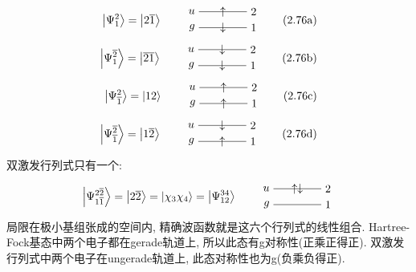 \begin{align*}
\ket{\Psi_1^2}=\ket{2\bar{1}}\qquad
\begin{tikzpicture}[baseline={([yshift=-.8ex]current bounding box.center)}]
\draw (0,0)node[left] {$u$}--node[pos=0.5]{$\uparrow$}(1.5,0)node[right]{2};
\draw (0,-0.5)node[left] {$g$}--node[pos=0.5]{$\downarrow$}(1.5,-0.5)node[right]{1};
\end{tikzpicture}\tag*{(2.76a)}
\\
\ket{\Psi_1^{\bar{2}}}=\ket{\bar{21}}\qquad
\begin{tikzpicture}[baseline={([yshift=-.8ex]current bounding box.center)}]
\draw (0,0)node[left] {$u$}--node[pos=0.5]{$\downarrow$}(1.5,0)node[right]{2};
\draw (0,-0.5)node[left] {$g$}--node[pos=0.5]{$\downarrow$}(1.5,-0.5)node[right]{1};
\end{tikzpicture}\tag*{(2.76b)}
\\
\ket{\Psi_{\bar{1}}^2}=\ket{{12}}\qquad
\begin{tikzpicture}[baseline={([yshift=-.8ex]current bounding box.center)}]
\draw (0,0)node[left] {$u$}--node[pos=0.5]{$\uparrow$}(1.5,0)node[right]{2};
\draw (0,-0.5)node[left] {$g$}--node[pos=0.5]{$\uparrow$}(1.5,-0.5)node[right]{1};
\end{tikzpicture}\tag*{(2.76c)}
\\
\ket{\Psi_{\bar{1}}^{\bar{2}}}=\ket{1\bar{2}}\qquad
\begin{tikzpicture}[baseline={([yshift=-.8ex]current bounding box.center)}]
\draw (0,0)node[left] {$u$}--node[pos=0.5]{$\downarrow$}(1.5,0)node[right]{2};
\draw (0,-0.5)node[left] {${g}$}--node[pos=0.5]{$\uparrow$}(1.5,-0.5)node[right]{1};
\end{tikzpicture}\tag*{(2.76d)}
\addtocounter{equation}{1}
\end{align*}
双激发行列式只有一个:
\begin{equation}
\ket{\Psi_{1\bar{1}}^{2\bar{2}}}=\ket{2\bar{2}}=\ket{\chi_3\chi_4}=\ket{\Psi_{12}^{34}}\qquad
\begin{tikzpicture}[baseline={([yshift=-.8ex]current bounding box.center)}]
\draw (0,0)node[left] {$u$}--node[pos=0.5]{$\uparrow\downarrow$}(1.5,0)node[right]{2};
\draw (0,-0.5)node[left] {$g$}--(1.5,-0.5)node[right]{1};
\end{tikzpicture}
\end{equation}
局限在极小基组张成的空间内, 
精确波函数就是这六个行列式的线性组合. 
Hartree-Fock基态中两个电子都在gerade轨道上, 
所以此态有g对称性(正乘正得正). 
双激发行列式中两个电子在ungerade轨道上, 
此态对称性也为g(负乘负得正). 
